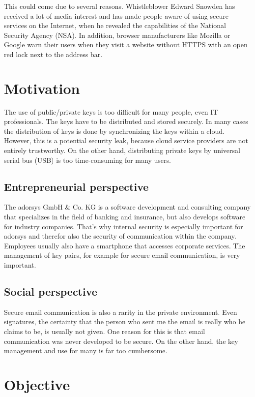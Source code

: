 \documentclass[12pt,oneside,a4paper,parskip]{scrbook}
\begin{document}
This could come due to several reasons. Whistleblower Edward Snowden has received a lot of media interest and has made people aware of using secure services on the Internet, when he revealed the capabilities of the National Security Agency (NSA). In addition, browser manufacturers like Mozilla or Google warn their users when they visit a website without HTTPS with an open red lock next to the address bar.


\section{Motivation}

The use of public/private keys is too difficult for many people, even IT professionals. The keys have to be distributed and stored securely. In many cases the distribution of keys is done by synchronizing the keys within a cloud. However, this is a potential security leak, because cloud service providers are not entirely trustworthy. On the other hand, distributing private keys
by universal serial bus (USB) is too time-consuming for many users.

\subsection{Entrepreneurial perspective}

The adorsys GmbH \& Co. KG is a software development and consulting company that specializes in the field of banking and insurance, but also develops software for industry companies. That's why internal security is especially important for adorsys and therefor also the security of communication within the company. Employees usually also have a smartphone that accesses corporate services. The management of key pairs, for example for secure email communication, is very important. 

\subsection{Social perspective}

Secure email communication is also a rarity in the private environment. Even signatures, the certainty that the person who sent me the email is really who he claims to be, is usually not given. 
One reason for this is that email communication was never developed to be secure. On the other hand, the key management and use for many is far too cumbersome. 

\section{Objective}
\end{document}
